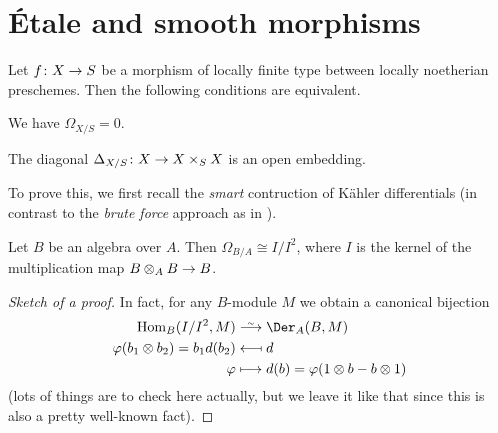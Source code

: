 \documentclass[a4paper,parskip=half,numbers=enddot, DIV=12]{scrreprt}
\begin{document}
\section{Étale and smooth morphisms}
\begin{prop}
	Let $f\colon X\morphism S$ be a morphism of locally finite type between locally noetherian preschemes. Then the following conditions are equivalent.
	\begin{alphanumerate}
		\item We have $\Omega_{X/S}=0$.
		\item The diagonal $\Delta_{X/S}\colon X\morphism X\times_SX$ is an open embedding.
	\end{alphanumerate}
\end{prop}
To prove this, we first recall the \emph{smart} contruction of Kähler differentials (in contrast to the \emph{brute force} approach as in \cite[Proposition~1.4.1]{alg2}).
\begin{lem}
	Let $B$ be an algebra over $A$. Then $\Omega_{B/A}\cong I/I^2$, where $I$ is the kernel of the multiplication map $B\otimes_AB\morphism B$.
\end{lem}
\begin{proof}[Sketch of a proof]
	In fact, for any $B$-module $M$ we obtain a canonical bijection
	\begin{align*}
		\Hom_B(I/I^2,M)&\isomorphism \Der_A(B,M)\\
		\phi(b_1\otimes b_2)=b_1d(b_2)&\longmapsfrom d\\
		\phi&\longmapsto d(b)=\phi(1\otimes b-b\otimes 1)
	\end{align*}
	(lots of things are to check here actually, but we leave it like that since this is also a pretty well-known fact).
\end{proof}
\end{document}
